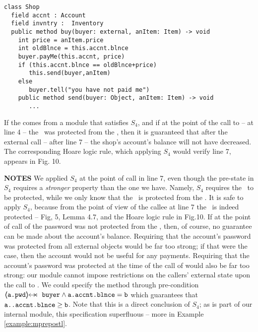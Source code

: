 \begin{lstlisting}
class Shop
  field accnt : Account
  field invntry :  Inventory    
  public method buy(buyer: external, anItem: Item) -> void
    int price = anItem.price
    int oldBlnce = this.accnt.blnce
    buyer.payMe(this.accnt, price)
    if (this.accnt.blnce == oldBlnce+price)
       this.send(buyer,anItem)
    else
       buyer.tell("you have not paid me") 
    public method send(buyer: Object, anItem: Item) -> void  
       ...            
\end{lstlisting}
 
\noindent
 
If the  comes from a module that satisfies $S_4$, and if at the point of the call to  -- \ie at line 4 -- the \password~was protected from the , then it is guaranteed that after the external call -- \ie after line 7 --  the shop's account's balance will not have decreased.
{The corresponding Hoare logic rule, which applying  $S_4$ would verify line 7, appears in Fig. 10.}

 

\vspace{.1cm}

  \noindent
 \textbf{NOTES}
 \notesep We   applied $S_4$ at the point of call in line 7, even   though  
 the pre-state in $S_4$ requires %
 a \emph{stronger} property than the one we have.
 Namely,   $S_4$ requires   the \password~to be protected, while we only know 
  that the \password~is protected from the  .
It is safe to apply $S_4$,  because from the point of view of the callee at line 7 the \password~is indeed protected -- \cf Fig, 5,   Lemma 4.7, and the 
  Hoare logic rule in Fig.10.
  \notesep  If at the point of call of  the  password was not protected from the , then, of course, no guarantee can be made about the account's balance.
 \notesep Requiring that the account's password was protected from all external objects would be far too strong; if that were the case, then the account would not be useful for any payments.
 \notesep Requiring that the account's  password was protected at the time of the call of  would also be far too strong: our module cannot impose restrictions on the callers' external state  upon the call to .
 \notesep 
 We could specify the method  through pre-condition $\protectedFrom {\prg{a.pwd}} {\prg{buyer}} \wedge {\prg{a.\myAccount.\balance}}=\prg{b}$ which
 guarantees that $\mbox{\normalfont{\texttt{a..\mbox{\normalfont{\texttt{accnt}}}.\mbox{\normalfont{\texttt{blnce}}}}}}\geq \mbox{\normalfont{\texttt{b}}}$.  Note that this is a  direct conclusion of $S_4$; 
  as  is part of our internal module, this specification superfluous -- more in Example \ref{example:mprepostl}.
 
